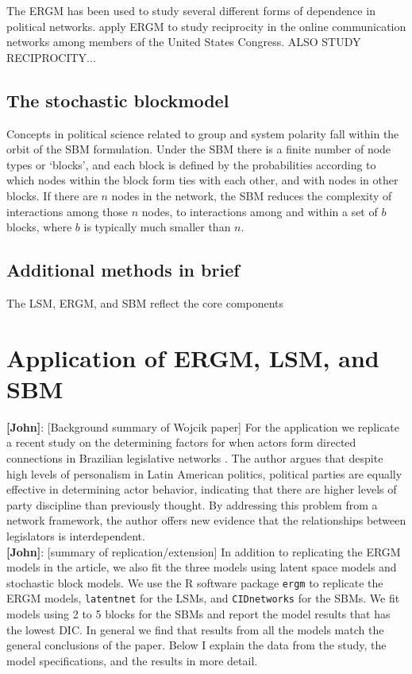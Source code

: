 \documentclass[fleqn,12pt]{wlscirep}
\begin{document}
The ERGM has been used to study several different forms of dependence in political networks. \cite{peng2016follower} apply ERGM to study reciprocity in the online communication networks among members of the United States Congress. \cite{osei2018party} ALSO STUDY RECIPROCITY...


\subsection{The stochastic blockmodel}

Concepts in political science related to group  and system polarity \citep[e.g., ][]{baldassarri2007dynamics,cranmer2015kantian} fall within the orbit of the SBM formulation. Under the SBM there is a finite number of node types or `blocks', and each block is defined by the probabilities according to which nodes within the block form ties with each other, and with nodes in other blocks. If there are $n$ nodes in the network, the SBM reduces the complexity of interactions among those $n$  nodes, to interactions among and within a set of $b$ blocks, where $b$ is typically much smaller than $n$. 

\subsection{Additional methods in brief}

The LSM, ERGM, and SBM reflect the core components

\section{Application of ERGM, LSM, and SBM}

{\bf [John]}: [Background summary of Wojcik paper] For the application we replicate a recent study on the determining factors for when actors form directed connections in Brazilian legislative networks \citep{wojcik2017legislative}. The author argues that despite high levels of personalism in Latin American politics, political parties are equally effective in determining actor behavior, indicating that there are higher levels of party discipline than previously thought. By addressing this problem from a network framework, the author offers new evidence that the relationships between legislators is interdependent.\\

{\bf [John]}: [summary of replication/extension] In addition to replicating the ERGM models in the article, we also fit the three models using latent space models and stochastic block models. We use the R software package \texttt{ergm} to replicate the ERGM models, \texttt{latentnet} for the LSMs, and \texttt{CIDnetworks} for the SBMs.  We fit models using 2 to 5 blocks for the SBMs and report the model results that has the lowest DIC. In general we find that results from all the models match the general conclusions of the paper. Below I explain the data from the study, the model specifications, and the results in more detail.
\end{document}
